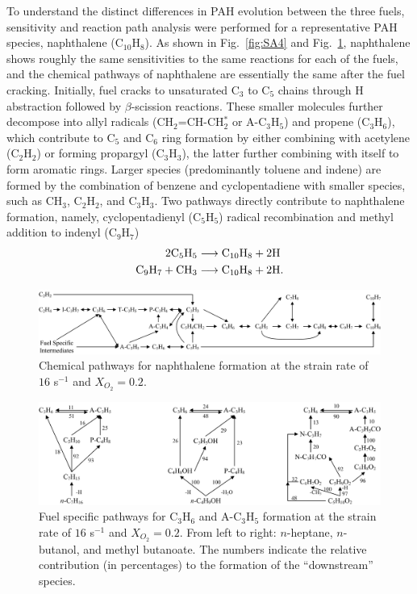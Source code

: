 To understand the distinct differences in PAH evolution between the three fuels, sensitivity and reaction path analysis were performed for a representative PAH species, naphthalene (C$_{10}$H$_8$).  As shown in Fig.~\ref{fig:SA4} and Fig.~\ref{fig:Pathways_PAH}, naphthalene shows roughly the same sensitivities to the same reactions for each of the fuels, and the chemical pathways of naphthalene are essentially the same after the fuel cracking. Initially, fuel cracks to unsaturated C$_3$ to C$_5$ chains through H abstraction followed by $\beta$-scission reactions. These smaller molecules further decompose into allyl radicals (CH$_2$=CH-CH$_2^*$ or A-C$_3$H$_5$) and propene (C$_3$H$_6$), which contribute to C$_5$ and C$_6$ ring formation by either combining with acetylene (C$_2$H$_2$) or forming propargyl (C$_3$H$_3$), the latter further combining with itself to form aromatic rings. Larger species (predominantly toluene and indene) are formed by the combination of benzene and cyclopentadiene with smaller species, such as CH$_3$, C$_2$H$_2$, and C$_3$H$_3$. Two pathways directly contribute to naphthalene formation, namely, cyclopentadienyl (C$_5$H$_5$) radical recombination and methyl addition to indenyl (C$_9$H$_7$)
\begin{align*}
  2 {\rm C}_5{\rm H}_5 &\longrightarrow {\rm C}_{10}{\rm H}_8 + 2 {\rm H}\\
  {\rm C}_9{\rm H}_7 + {\rm C}{\rm H}_3 &\longrightarrow {\rm C}_{10}{\rm H}_8 + 2 {\rm H}.
\end{align*}

\begin{figure}[t]
  \centering
  \scriptsize
  \includegraphics[width=1.0\textwidth]{ch-biofuel/Pathways-PAH.png}
  \normalsize
  \caption{Chemical pathways for naphthalene formation at the strain rate of $16$ s$^{-1}$ and $X_{O_2}=0.2$.}
  \label{fig:Pathways_PAH}
\end{figure}

\begin{figure}[t]
  \centering
  \scriptsize
  \includegraphics[width=1.0\textwidth]{ch-biofuel/Pathways_Fuel.png}
  \normalsize
  \caption{Fuel specific pathways for C$_3$H$_6$ and A-C$_3$H$_5$ formation at the strain rate of $16$ s$^{-1}$ and $X_{O_2}=0.2$. From left to right: $n$-heptane, $n$-butanol, and methyl butanoate.  The numbers indicate the relative contribution (in percentages) to the formation of the ``downstream'' species.}
  \label{fig:Pathways_Fuel}
\end{figure}

